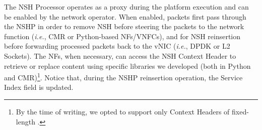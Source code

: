 
The NSH Processor operates as a proxy during the platform execution and can be enabled by the network operator. When enabled, packets first pass through the NSHP in order to remove NSH before steering the packets to the network function (\textit{i.e.}, CMR or Python-based NFs/VNFCs), and for NSH reinsertion before forwarding processed packets back to the vNIC (\textit{i.e.}, DPDK or L2 Sockets). The NFs, when necessary, can access the NSH Context Header to retrieve or replace content using specific libraries we developed (both in Python and CMR)\footnote{By the time of writing, we opted to support only Context Headers of fixed-length \cite{Quinn-2018}.}. Notice that, during the NSHP reinsertion operation, the Service Index field is updated.


